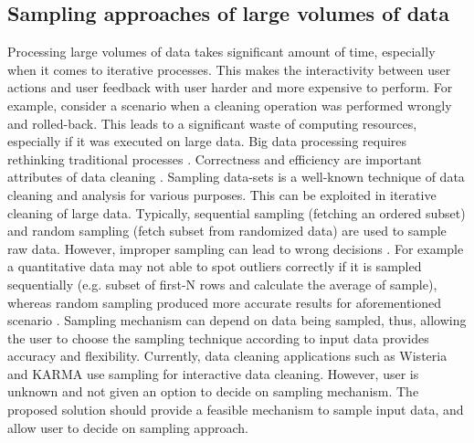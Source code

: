 \subsection{Sampling approaches of large volumes of data}
\noindent Processing large volumes of data takes significant amount of time, especially when it comes to iterative processes. This makes the interactivity between user actions and user feedback with user harder and more expensive to perform. For example, consider a scenario when a cleaning operation was performed wrongly and rolled-back. This leads to a significant waste of computing resources, especially if it was executed on large data. Big data processing requires rethinking traditional processes \cite{nemreport}. Correctness and efficiency are important attributes of data cleaning \cite{journals/corr/KrishnanW0FG16}. Sampling data-sets is a well-known technique of data cleaning and analysis \cite{Hellerstein08quantitativedata} for various purposes. This can be exploited in iterative cleaning of large data. Typically, sequential sampling (fetching an ordered subset) and random sampling (fetch subset from randomized data) are used to sample raw data. However, improper sampling can lead to wrong decisions \cite{journals/corr/KrishnanW0FG16}. For example a quantitative data may not able to spot outliers correctly if it is sampled sequentially (e.g. subset of first-N rows and calculate the average of sample), whereas random sampling produced more accurate results for aforementioned scenario \cite{Hellerstein08quantitativedata}. Sampling mechanism can depend on data being sampled, thus, allowing the user to choose the sampling technique according to input data provides accuracy and flexibility. Currently, data cleaning applications such as Wisteria \cite{Wisteria} and KARMA  \cite{knoblock15:aimag} use sampling for interactive data cleaning. However, user is unknown and not given an option to decide on sampling mechanism. The proposed solution should provide a feasible mechanism to sample input data, and allow user to decide on sampling approach. 

